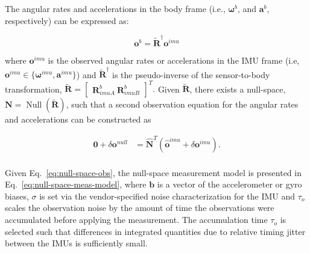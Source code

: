 The angular rates and accelerations in the body frame (i.e., $\bm{\omega}^b$, and $\bm{a}^b$, respectively) can be expressed as:  



\begin{equation}
\bm{o}^{b} = \tilde{\bm{R}}^{\dagger}\bm{o}^{imu} 
\end{equation}


\noindent where $\bm{o}^{imu}$ is the observed angular rates or accelerations in the \ac{IMU} frame (i.e, $\bm{o}^{imu} \in \{\bm{\omega}^{imu}, \bm{a}^{imu}\}$) and $\bm{\tilde{R}}^{\dagger}$ is the pseudo-inverse of the sensor-to-body transformation, $\tilde{\bm{R}} = \begin{bmatrix} \bm{R}_{imuA}^{b} \ \bm{R}_{imuB}^{b} \end{bmatrix}^{T}.$ Given $\tilde{\bm{R}}$, there exists a null-space, $\bm{N} = \operatorname{Null}(\tilde{\bm{R}})$, such that a second observation equation for the angular rates and accelerations can be constructed as

\begin{equation}
\begin{aligned}
\bm{0} + \delta\bm{o}^{null} &= \hat{\bm{N}}^{T}\left(\hat{\bm{o}}^{imu} + \delta\bm{o}^{imu}\right). \\
\label{eq:null-space-obs}
\end{aligned}
\end{equation}

\noindent Given Eq.~\ref{eq:null-space-obs}, the null-space measurement model is presented in Eq.~\ref{eq:null-space-meas-model}, where $\bm{b}$ is a vector of the accelerometer or gyro biases, $\sigma$ is set via the vendor-specified noise characterization for the IMU and $\tau_o$ scales the observation noise by the amount of time the observations were accumulated before applying the measurement. The accumulation time $\tau_o$ is selected such that differences in integrated quantities due to relative timing jitter between the IMUs is sufficiently small.

